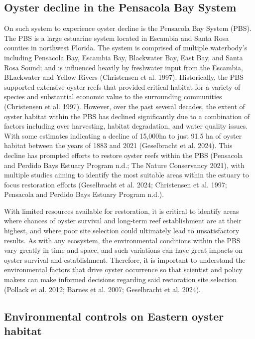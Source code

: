 \documentclass[
  letterpaper,
  DIV=11,
  numbers=noendperiod]{scrartcl}
\begin{document}
\subsection{Oyster decline in the Pensacola Bay
System}\label{oyster-decline-in-the-pensacola-bay-system}

On such system to experience oyster decline is the Pensacola Bay System
(PBS). The PBS is a large estuarine system located in Escambia and Santa
Rosa counties in northwest Florida. The system is comprised of multiple
waterbody's including Pensacola Bay, Escambia Bay, Blackwater Bay, East
Bay, and Santa Rosa Sound; and is influenced heavily by freshwater input
from the Escambia, BLackwater and Yellow Rivers (Christensen et al.
1997). Historically, the PBS supported extensive oyster reefs that
provided critical habitat for a variety of species and substantial
economic value to the surrounding communities (Christensen et al. 1997).
However, over the past several decades, the extent of oyster habitat
within the PBS has declined significantly due to a combination of
factors including over harvesting, habitat degradation, and water
quality issues. With some estimates indicating a decline of 15,000ha to
just 91.5 ha of oyster habitat between the years of 1883 and 2021
(Geselbracht et al. 2024). This decline has prompted efforts to restore
oyster reefs within the PBS (Pensacola and Perdido Bays Estuary Program
n.d.; The Nature Conservancy 2021), with multiple studies aiming to
identify the most suitable areas within the estuary to focus restoration
efforts (Geselbracht et al. 2024; Christensen et al. 1997; Pensacola and
Perdido Bays Estuary Program n.d.).

With limited resources available for restoration, it is critical to
identify areas where chances of oyster survival and long-term reef
establishment are at their highest, and where poor site selection could
ultimately lead to unsatisfactory results. As with any ecosystem, the
environmental conditions within the PBS vary greatly in time and space,
and such variations can have great impacts on oyster survival and
establishment. Therefore, it is important to understand the
environmental factors that drive oyster occurrence so that scientist and
policy makers can make informed decisions regarding said restoration
site selection (Pollack et al. 2012; Barnes et al. 2007; Geselbracht et
al. 2024).

\subsection{Environmental controls on Eastern oyster
habitat}\label{environmental-controls-on-eastern-oyster-habitat}
\end{document}

